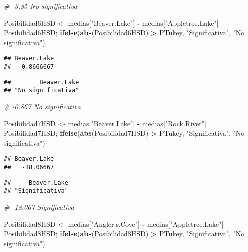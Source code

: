 \documentclass[
]{article}
\newenvironment{Shaded}{\begin{snugshade}}{\end{snugshade}}
\newcommand{\CommentTok}[1]{\textcolor[rgb]{0.56,0.35,0.01}{\textit{#1}}}
\newcommand{\FunctionTok}[1]{\textcolor[rgb]{0.13,0.29,0.53}{\textbf{#1}}}
\newcommand{\NormalTok}[1]{#1}
\newcommand{\OtherTok}[1]{\textcolor[rgb]{0.56,0.35,0.01}{#1}}
\newcommand{\SpecialCharTok}[1]{\textcolor[rgb]{0.81,0.36,0.00}{\textbf{#1}}}
\newcommand{\StringTok}[1]{\textcolor[rgb]{0.31,0.60,0.02}{#1}}
\begin{document}
\begin{Shaded}
\begin{Highlighting}[]
\CommentTok{\# {-}3.85 No significativa}

\NormalTok{Posibilidad6HSD }\OtherTok{\textless{}{-}}\NormalTok{ medias[}\StringTok{"Beaver.Lake"}\NormalTok{] }\SpecialCharTok{{-}}\NormalTok{ medias[}\StringTok{"Appletree.Lake"}\NormalTok{]}
\NormalTok{Posibilidad6HSD; }\FunctionTok{ifelse}\NormalTok{(}\FunctionTok{abs}\NormalTok{(Posibilidad6HSD) }\SpecialCharTok{\textgreater{}}\NormalTok{ PTukey, }\StringTok{"Significativa"}\NormalTok{, }\StringTok{"No significativa"}\NormalTok{)}
\end{Highlighting}
\end{Shaded}

\begin{verbatim}
## Beaver.Lake 
##  -0.8666667
\end{verbatim}

\begin{verbatim}
##        Beaver.Lake 
## "No significativa"
\end{verbatim}

\begin{Shaded}
\begin{Highlighting}[]
\CommentTok{\# {-}0.867 No significativa}

\NormalTok{Posibilidad7HSD }\OtherTok{\textless{}{-}}\NormalTok{ medias[}\StringTok{"Beaver.Lake"}\NormalTok{] }\SpecialCharTok{{-}}\NormalTok{ medias[}\StringTok{"Rock.River"}\NormalTok{]}
\NormalTok{Posibilidad7HSD; }\FunctionTok{ifelse}\NormalTok{(}\FunctionTok{abs}\NormalTok{(Posibilidad7HSD) }\SpecialCharTok{\textgreater{}}\NormalTok{ PTukey, }\StringTok{"Significativa"}\NormalTok{, }\StringTok{"No significativa"}\NormalTok{)}
\end{Highlighting}
\end{Shaded}

\begin{verbatim}
## Beaver.Lake 
##   -18.06667
\end{verbatim}

\begin{verbatim}
##     Beaver.Lake 
## "Significativa"
\end{verbatim}

\begin{Shaded}
\begin{Highlighting}[]
\CommentTok{\# {-}18.067 Significativa}

\NormalTok{Posibilidad8HSD }\OtherTok{\textless{}{-}}\NormalTok{ medias[}\StringTok{"Angler.s.Cove"}\NormalTok{] }\SpecialCharTok{{-}}\NormalTok{ medias[}\StringTok{"Appletree.Lake"}\NormalTok{]}
\NormalTok{Posibilidad8HSD; }\FunctionTok{ifelse}\NormalTok{(}\FunctionTok{abs}\NormalTok{(Posibilidad8HSD) }\SpecialCharTok{\textgreater{}}\NormalTok{ PTukey, }\StringTok{"Significativa"}\NormalTok{, }\StringTok{"No significativa"}\NormalTok{)}
\end{Highlighting}
\end{Shaded}
\end{document}
